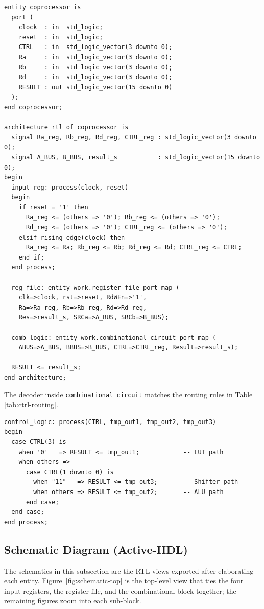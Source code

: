 \documentclass[11pt,a4paper]{article}
\begin{document}
\begin{lstlisting}[caption={Top-level entity (\texttt{src/coprocessor.vhd}, abridged).}]
entity coprocessor is
  port (
    clock  : in  std_logic;
    reset  : in  std_logic;
    CTRL   : in  std_logic_vector(3 downto 0);
    Ra     : in  std_logic_vector(3 downto 0);
    Rb     : in  std_logic_vector(3 downto 0);
    Rd     : in  std_logic_vector(3 downto 0);
    RESULT : out std_logic_vector(15 downto 0)
  );
end coprocessor;

architecture rtl of coprocessor is
  signal Ra_reg, Rb_reg, Rd_reg, CTRL_reg : std_logic_vector(3 downto 0);
  signal A_BUS, B_BUS, result_s           : std_logic_vector(15 downto 0);
begin
  input_reg: process(clock, reset)
  begin
    if reset = '1' then
      Ra_reg <= (others => '0'); Rb_reg <= (others => '0');
      Rd_reg <= (others => '0'); CTRL_reg <= (others => '0');
    elsif rising_edge(clock) then
      Ra_reg <= Ra; Rb_reg <= Rb; Rd_reg <= Rd; CTRL_reg <= CTRL;
    end if;
  end process;

  reg_file: entity work.register_file port map (
    clk=>clock, rst=>reset, RdWEn=>'1',
    Ra=>Ra_reg, Rb=>Rb_reg, Rd=>Rd_reg,
    Res=>result_s, SRCa=>A_BUS, SRCb=>B_BUS);

  comb_logic: entity work.combinational_circuit port map (
    ABUS=>A_BUS, BBUS=>B_BUS, CTRL=>CTRL_reg, Result=>result_s);

  RESULT <= result_s;
end architecture;
\end{lstlisting}

\noindent The decoder inside \texttt{combinational\_circuit} matches
the routing rules in Table \ref{tab:ctrl-routing}.

\begin{lstlisting}[caption={CTRL decoder driving the result MUX.}]
control_logic: process(CTRL, tmp_out1, tmp_out2, tmp_out3)
begin
  case CTRL(3) is
    when '0'   => RESULT <= tmp_out1;            -- LUT path
    when others =>
      case CTRL(1 downto 0) is
        when "11"   => RESULT <= tmp_out3;       -- Shifter path
        when others => RESULT <= tmp_out2;       -- ALU path
      end case;
  end case;
end process;
\end{lstlisting}

\subsection{Schematic Diagram (Active-HDL)}
\label{sec:schematic}

The schematics in this subsection are the RTL views exported after
elaborating each entity. Figure~\ref{fig:schematic-top} is the
top-level view that ties the four input registers, the register
file, and the combinational block together; the remaining figures
zoom into each sub-block.
\end{document}
